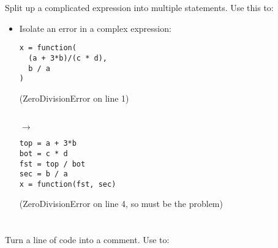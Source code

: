 \documentclass{handout}
\begin{document}
\newpage

\section{}

Split up a complicated expression into multiple statements. Use this to:

\begin{itemize}

\item Isolate an error in a complex expression: \\
\noindent
\begin{minipage}[t]{0.45\columnwidth}
\begin{lstlisting}
x = function(
  (a + 3*b)/(c * d),
  b / a
)
\end{lstlisting}
(ZeroDivisionError on line 1)
\end{minipage}
\begin{minipage}[t]{0.05\columnwidth}
\  \\
\hspace*{1ex}$\rightarrow$
\end{minipage}
\begin{minipage}[t]{0.45\columnwidth}
\begin{lstlisting}
top = a + 3*b
bot = c * d
fst = top / bot
sec = b / a
x = function(fst, sec)
\end{lstlisting}
(ZeroDivisionError on line 4, so  must be the problem)
\end{minipage}

\end{itemize}


\section{}

Turn a line of code into a comment. Use to:
\end{document}
